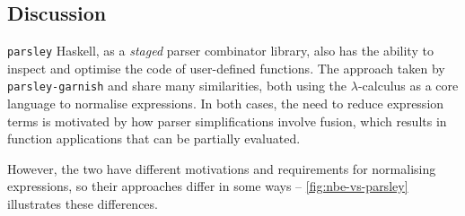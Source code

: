 \documentclass[../../../main.tex]{subfiles}
\begin{document}
\subsection*{Discussion}
\texttt{parsley} Haskell, as a \emph{staged} parser combinator library, also has the ability to inspect and optimise the code of user-defined functions.
The approach taken by \texttt{parsley-garnish} and  share many similarities, both using the $\lambda$-calculus as a core language to normalise expressions.
In both cases, the need to reduce expression terms is motivated by how parser simplifications involve fusion, which results in function applications that can be partially evaluated.

However, the two have different motivations and requirements for normalising expressions, so their approaches differ in some ways --
\cref{fig:nbe-vs-parsley} illustrates these differences.

\end{document}
